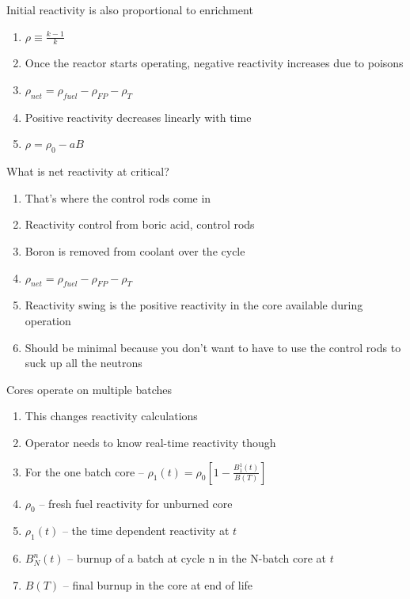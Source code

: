 \documentclass[aspectratio=1610,pdftex,dvipsnames,compress,xcolor={dvipsnames}]{beamer}
\begin{document}
\begin{frame}{Initial reactivity is also proportional to enrichment}
    \begin{enumerate}[series=outerlist,topsep=0pt,itemsep=21pt,leftmargin=*,label=(\arabic*)]
        \item[]$\rho \equiv \frac{k-1}{k}$
        \item[]Once the reactor starts operating, negative reactivity increases due to poisons
        \item[]$\rho_{net} = \rho_{fuel}-\rho_{FP}-\rho_T$
        \item[]Positive reactivity decreases linearly with time
        \item[]$\rho = \rho_0-aB$
    \end{enumerate}
\end{frame}


\begin{frame}{What is net reactivity at critical?}
    \begin{enumerate}[series=outerlist,topsep=0pt,itemsep=15pt,leftmargin=*,label=(\arabic*)]
        \item[]That's where the control rods come in
        \item[]Reactivity control from boric acid, control rods
        \item[]Boron is removed from coolant over the cycle
        \item[]$\rho_{net} = \rho_{fuel}-\rho_{FP}-\rho_T$
        \item[]Reactivity swing is the positive reactivity in the core available during operation
        \item[]Should be minimal because you don't want to have to use the control rods to suck up all the neutrons
    \end{enumerate}
\end{frame}


\begin{frame}{Cores operate on multiple batches}
    \begin{enumerate}[series=outerlist,topsep=0pt,itemsep=11pt,leftmargin=*,label=(\arabic*)]
        \item[]This changes reactivity calculations
        \item[]Operator needs to know real-time reactivity though
        \item[]For the one batch core -- $\rho_1(t) = \rho_0[1-\frac{B_1^1(t)}{B(T)}]$
        \item[]$\rho_0$ -- fresh fuel reactivity for unburned core
        \item[]$\rho_1(t)$ -- the time dependent reactivity at $t$
        \item[]$B_N^n(t)$ -- burnup of a batch at cycle n in the N-batch core at $t$
        \item[]$B(T)$ -- final burnup in the core at end of life
    \end{enumerate}
\end{frame}
\end{document}
